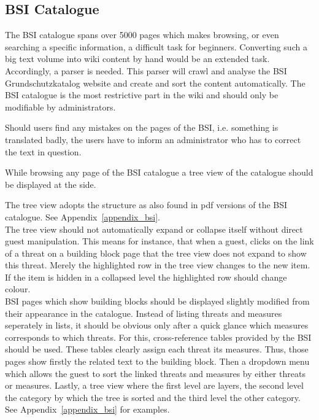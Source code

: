 \subsection{BSI Catalogue}
\label{BSIc}
The BSI catalogue spans over 5000 pages which makes browsing, or even searching a specific information, a difficult task for beginners. 
Converting such a big text volume into wiki content by hand would be an extended task. 
Accordingly, a parser is needed. 
This parser will crawl and analyse the BSI Grundschutzkatalog website and create and sort the content automatically. 
The BSI catalogue is the most restrictive part in the wiki and should only be modifiable by administrators.
\begin{tcolorbox}[breakable,colback=red!12,colframe=red!40!black,title=UPDATE 15/11/2017]
    Should users find any mistakes on the pages of the BSI, i.e. something is translated badly, the users have to inform an administrator who has to correct the text in question.
\end{tcolorbox}
\bigskip

While browsing any page of the BSI catalogue a tree view of the catalogue should be displayed at the side.
\bigskip

\begin{tcolorbox}[breakable,colback=red!10,colframe=red!40!black,title=UPDATE 13/11/2017]
The tree view adopts the structure as also found in pdf versions of the BSI catalogue. 
See Appendix~\ref{appendix_bsi}.\\
The tree view should not automatically expand or collapse itself without direct guest manipulation.
This means for instance, that when a guest, clicks on the link of a threat on a building block page that the tree view does not expand to show this threat.
Merely the highlighted row in the tree view changes to the new item.
If the item is hidden in a collapsed level the highlighted row should change colour.
\\
BSI pages which show building blocks should be displayed slightly modified from their appearance in the catalogue.
Instead of listing threats and measures seperately in lists, it should be obvious only after a quick glance which measures corresponds to which threats.
For this, cross-reference tables provided by the BSI should be used.
These tables clearly assign each threat its measures.
Thus, those pages show firstly the related text to the building block.
Then a dropdown menu which allows the guest to sort the linked threats and measures by either threats or measures.
Lastly, a tree view where the first level are layers, the second level the category by which the tree is sorted and the third level the other category.
See Appendix~\ref{appendix_bsi} for examples.
\end{tcolorbox}


